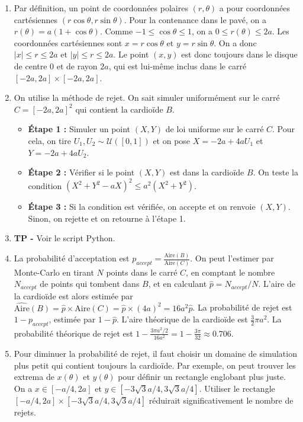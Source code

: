 \documentclass[solutions]{exercices}
\begin{document}
\begin{solution}
\begin{enumerate}
    \item Par définition, un point de coordonnées polaires $(r,\theta)$ a pour coordonnées cartésiennes $(r\cos\theta, r\sin\theta)$.
    Pour la contenance dans le pavé, on a $r(\theta) = a(1+\cos\theta)$. Comme $-1 \le \cos\theta \le 1$, on a $0 \le r(\theta) \le 2a$.
    Les coordonnées cartésiennes sont $x = r\cos\theta$ et $y = r\sin\theta$. On a donc $|x| \le r \le 2a$ et $|y| \le r \le 2a$.
    Le point $(x,y)$ est donc toujours dans le disque de centre 0 et de rayon $2a$, qui est lui-même inclus dans le carré $[-2a, 2a] \times [-2a, 2a]$.
    \item On utilise la méthode de rejet. On sait simuler uniformément sur le carré $C = [-2a,2a]^2$ qui contient la cardioïde $B$.
    \begin{itemize}
        \item \textbf{Étape 1 :} Simuler un point $(X,Y)$ de loi uniforme sur le carré $C$. Pour cela, on tire $U_1, U_2 \sim \mathcal{U}([0,1])$ et on pose $X = -2a + 4a U_1$ et $Y = -2a + 4a U_2$.
        \item \textbf{Étape 2 :} Vérifier si le point $(X,Y)$ est dans la cardioïde $B$. On teste la condition $(X^2+Y^2-aX)^2 \le a^2(X^2+Y^2)$.
        \item \textbf{Étape 3 :} Si la condition est vérifiée, on accepte et on renvoie $(X,Y)$. Sinon, on rejette et on retourne à l'étape 1.
    \end{itemize}
    \item \textbf{TP -} Voir le script Python.
    \item La probabilité d'acceptation est $p_{accept} = \frac{\text{Aire}(B)}{\text{Aire}(C)}$. On peut l'estimer par Monte-Carlo en tirant $N$ points dans le carré $C$, en comptant le nombre $N_{accept}$ de points qui tombent dans $B$, et en calculant $\hat{p} = N_{accept}/N$.
    L'aire de la cardioïde est alors estimée par $\widehat{\text{Aire}}(B) = \hat{p} \times \text{Aire}(C) = \hat{p} \times (4a)^2 = 16a^2 \hat{p}$.
    La probabilité de rejet est $1-p_{accept}$, estimée par $1-\hat{p}$. L'aire théorique de la cardioïde est $\frac{3}{2}\pi a^2$. La probabilité théorique de rejet est $1 - \frac{3\pi a^2/2}{16a^2} = 1 - \frac{3\pi}{32} \approx 0.706$.
    \item Pour diminuer la probabilité de rejet, il faut choisir un domaine de simulation plus petit qui contient toujours la cardioïde. Par exemple, on peut trouver les extrema de $x(\theta)$ et $y(\theta)$ pour définir un rectangle englobant plus juste. On a $x \in [-a/4, 2a]$ et $y \in [-3\sqrt{3}a/4, 3\sqrt{3}a/4]$. Utiliser le rectangle $[-a/4, 2a] \times [-3\sqrt{3}a/4, 3\sqrt{3}a/4]$ réduirait significativement le nombre de rejets.
\end{enumerate}
\end{solution}
\end{document}

